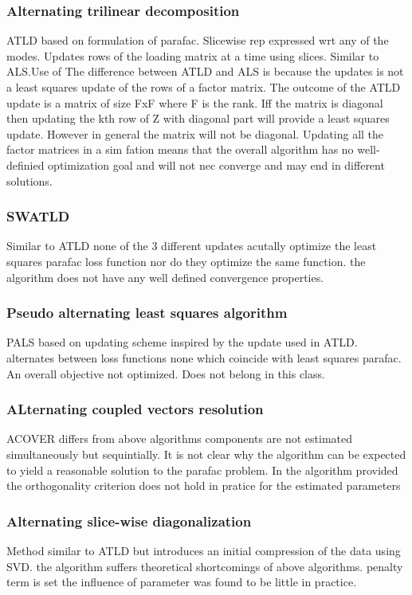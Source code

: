 \documentclass[10pt, draft]{article}
\begin{document}
\subsubsection{Alternating trilinear decomposition}

ATLD based on formulation of parafac. Slicewise rep expressed wrt any of the modes.  Updates rows of the loading matrix at a time using slices.  Similar to ALS.Use of The difference between ATLD and ALS is because the updates is not a least squares update of the rows of a factor matrix.  The outcome of the ATLD update is a matrix of size FxF where F is the rank.  Iff the matrix is diagonal then updating the kth row of Z with diagonal part will provide a least squares update.  However in general the matrix will not be diagonal.  Updating all the factor matrices in a sim fation means that the overall algorithm has no well-definied optimization goal and will not nec converge and may end in different solutions.  

\subsubsection{SWATLD}
Similar to ATLD none of the 3 different updates acutally optimize the least squares parafac loss function nor do they optimize the same function.  the algorithm does not have any well defined convergence properties.  

\subsubsection{Pseudo alternating least squares algorithm}
PALS based on updating scheme inspired by the update used in ATLD.  alternates between loss functions none which coincide with least squares parafac.  An overall objective not optimized.  Does not belong in this class.

\subsubsection{ALternating coupled vectors resolution}
ACOVER differs from above algorithms components are not estimated simultaneously but sequintially.  It is not clear why the algorithm can be expected to yield a reasonable solution to the parafac problem.  In the algorithm provided the orthogonality criterion does not hold in pratice for the estimated parameters

\subsubsection{Alternating slice-wise diagonalization}
Method similar to ATLD but introduces an initial compression of the data using SVD.  the algorithm suffers theoretical shortcomings of above algorithms.  penalty term is set the influence of parameter was found to be little in practice. 
\end{document}
